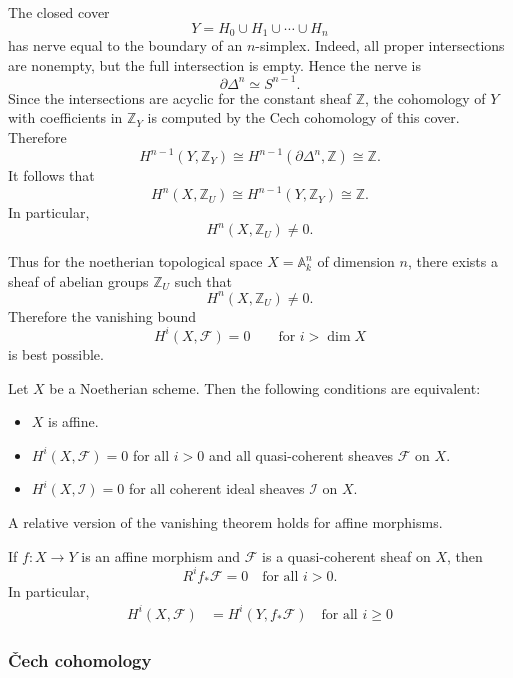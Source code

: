 \documentclass[12pt]{article}
\begin{document}
\begin{solution}
    The closed cover
    \[
        Y=H_0\cup H_1\cup \cdots \cup H_n
    \]
    has nerve equal to the boundary of an $n$-simplex. Indeed, all proper
    intersections are nonempty, but the full intersection is empty. Hence the
    nerve is
    \[
        \partial \Delta^n\simeq S^{n-1}.
    \]
    Since the intersections are acyclic for the constant sheaf $\mathbb Z$, the
    cohomology of $Y$ with coefficients in $\mathbb Z_Y$ is computed by the
    Cech cohomology of this cover. Therefore
    \[
        H^{n-1}(Y,\mathbb Z_Y)
        \cong
        H^{n-1}(\partial\Delta^n,\mathbb Z)
        \cong
        \mathbb Z.
    \]
    It follows that
    \[
        H^n(X,\mathbb Z_U)
        \cong
        H^{n-1}(Y,\mathbb Z_Y)
        \cong
        \mathbb Z.
    \]
    In particular,
    \[
        H^n(X,\mathbb Z_U)\neq 0.
    \]

    Thus for the noetherian topological space $X=\mathbb A^n_k$ of dimension
    $n$, there exists a sheaf of abelian groups $\mathbb Z_U$ such that
    \[
        H^n(X,\mathbb Z_U)\neq 0.
    \]
    Therefore the vanishing bound
    \[
        H^i(X,\mathcal F)=0
        \qquad
        \text{for } i>\dim X
    \]
    is best possible.
\end{solution}

\begin{theorem}
    Let $X$ be a Noetherian scheme. Then the following conditions are equivalent:
    \begin{itemize}
        \item $X$ is affine.
        \item $H^i(X,\mathcal F)=0$ for all $i>0$ and all quasi-coherent sheaves $\mathcal F$ on $X$.
        \item $H^i(X,\mathcal I)=0$ for all coherent ideal sheaves $\mathcal I$ on $X$.
    \end{itemize}
\end{theorem}

A relative version of the vanishing theorem holds for affine morphisms.
\begin{theorem}
    If $f:X\to Y$ is an affine morphism and $\mathcal F$ is a quasi-coherent sheaf on $X$, then
    \[R^i f_*\mathcal F = 0 \quad \text{for all }i>0.\] In particular, \begin{align*}
        H^i(X,\mathcal F) & = H^i(Y,f_*\mathcal F) \quad \text{for all } i\ge 0
    \end{align*}
\end{theorem}

\subsubsection{Čech cohomology}
\end{document}
